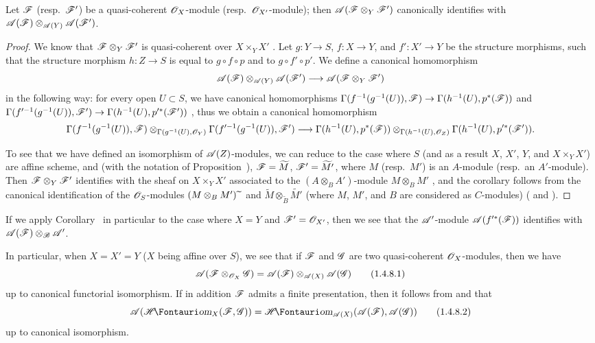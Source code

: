 \begin{corollary}[1.4.7]
\label{II.1.4.7}
Let $\mathscr{F}$ (resp.~$\mathscr{F}'$) be a quasi-coherent $\mathscr{O}_X$-module (resp.~$\mathscr{O}_{X'}$-module); then $\mathscr{A}(\mathscr{F}\otimes_Y\mathscr{F}')$ canonically identifies with $\mathscr{A}(\mathscr{F})\otimes_{\mathscr{A}(Y)}\mathscr{A}(\mathscr{F}')$.
\end{corollary}

\begin{proof}
We know that $\mathscr{F}\otimes_Y\mathscr{F}'$ is quasi-coherent over $X\times_Y X'$ .
Let $g:Y\to S$, $f:X\to Y$, and $f':X'\to Y$ be the structure morphisms, such that the structure morphism
$h:Z\to S$ is equal to $g\circ f\circ p$ and to $g\circ f'\circ p'$.
We define a canonical homomorphism
\[
  \sh{A}(\sh{F})\otimes_{\sh{A}(Y)}\sh{A}(\sh{F}')\to\sh{A}(\sh{F}\otimes_Y\sh{F}')
\]
in the following way: for every open $U\subset S$, we have canonical homomorphisms $\Gamma(f^{-1}(g^{-1}(U)),\sh{F})\to\Gamma(h^{-1}(U),p^*(\sh{F}))$ and $\Gamma(f^{\prime-1}(g^{-1}(U)),\sh{F}')\to\Gamma(h^{-1}(U),p^{\prime*}(\sh{F}'))$ , thus we obtain a canonical homomorphism
\[
  \Gamma(f^{-1}(g^{-1}(U)),\sh{F})\otimes_{\Gamma(g^{-1}(U),\sh{O}_Y)}\Gamma(f^{\prime-1}(g^{-1}(U)),\sh{F}')\to\Gamma(h^{-1}(U),p^*(\sh{F}))\otimes_{\Gamma(h^{-1}(U),\sh{O}_Z)}\Gamma(h^{-1}(U),p^{\prime*}(\sh{F}')).
\]

To see that we have defined an isomorphism of $\mathscr{A}(Z)$-modules, we can reduce to the case where $S$ (and as a result $X$, $X'$, $Y$, and $X\times_Y X'$) are affine scheme, and (with the notation of Proposition~), $\mathscr{F}=\widetilde{M}$, $\mathscr{F}'=\widetilde{M'}$, where $M$ (resp.~$M'$) is an $A$-module (resp.~an $A'$-module).
Then $\mathscr{F}\otimes_Y\mathscr{F}'$ identifies with the sheaf on $X\times_Y X'$ associated to the $(A\otimes_B A')$-module $M\otimes_B M'$ , and the corollary follows from the canonical identification of the $\mathscr{O}_S$-modules $(M\otimes_B M'){\,\widetilde{\,}\,}$ and $\widetilde{M}\otimes_{\widetilde{B}}\widetilde{M'}$ (where $M$, $M'$, and $B$ are considered as $C$-modules) ( and ).
\end{proof}

If we apply Corollary~ in particular to the case where $X=Y$ and $\mathscr{F}'=\mathscr{O}_{X'}$, then we see that the $\mathscr{A}'$-module $\mathscr{A}(f^{\prime*}(\mathscr{F}))$ identifies with $\mathscr{A}(\mathscr{F})\otimes_\mathscr{B}\mathscr{A}'$.

\begin{env}[1.4.8]
\label{II.1.4.8}
In particular, when $X=X'=Y$ ($X$ being affine over $S$), we see that if $\mathscr{F}$ and $\mathscr{G}$ are two quasi-coherent $\mathscr{O}_X$-modules, then we have
\[
\label{II.1.4.8.1}
  \mathscr{A}(\mathscr{F}\otimes_{\mathscr{O}_X}\mathscr{G})=\mathscr{A}(\mathscr{F})\otimes_{\mathscr{A}(X)}\mathscr{A}(\mathscr{G})
  \tag{1.4.8.1}
\]
up to canonical functorial isomorphism.
If in addition $\mathscr{F}$ admits a finite presentation, then it follows from  and  that
\[
\label{II.1.4.8.2}
  \sh{A}(\shHom_X(\sh{F},\sh{G}))=\shHom_{\sh{A}(X)}(\sh{A}(\sh{F}),\sh{A}(\sh{G}))
  \tag{1.4.8.2}
\]
up to canonical isomorphism.
\end{env}

